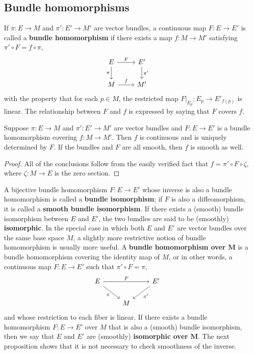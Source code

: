 \subsection{Bundle homomorphisms}
If $\pi:E\to M$ and $\pi':E'\to M'$ are vector bundles, a continuous map $F:E\to E'$ is called a \textbf{bundle homomorphism} if there exists a map $f:M\to M'$ 
satisfying $\pi'\circ F=f\circ\pi$,
\[\begin{tikzcd}
E\ar[r,"F"]\ar[d,swap,"\pi"]&E'\ar[d,"\pi'"]\\
M\ar[r,"f"]&M'
\end{tikzcd}\]
with the property that for each $p\in M$, the restricted map $F|_{E_p}:E_p\to E'_{f(p)}$ is linear. The relationship between $F$ and $f$ is expressed by saying that 
$F$ covers $f$.
\begin{proposition}
Suppose $\pi:E\to M$ and $\pi':E'\to M'$ are vector bundles and $F:E\to E'$ is a bundle homomorphism covering $f:M\to M'$. Then $f$ is continuous and is uniquely determined by $F$. If the bundles and $F$ are all smooth, then $f$ is smooth as well.
\end{proposition}
\begin{proof}
All of the conclusions follow from the easily verified fact that $f=\pi'\circ F\circ\zeta$, where $\zeta:M\to E$ is the zero section.
\end{proof}
A bijective bundle homomorphism $F:E\to E'$ whose inverse is also a bundle homomorphism is called a \textbf{bundle isomorphism}; if $F$ is also a diffeomorphism, it is 
called a \textbf{smooth bundle isomorphism}. If there exists a (smooth) bundle isomorphism between $E$ and $E'$, the two bundles are said to be (smoothly) 
\textbf{isomorphic}. In the special case in which both $E$ and $E'$ are vector bundles over the same base space $M$, a slightly more restrictive notion of bundle 
homomorphism is usually more useful. A \textbf{bundle homomorphism over $\bm{M}$} is a bundle homomorphism covering the identity map of $M$, or in other words, 
a continuous map $F:E\to E'$ such that $\pi'\circ F=\pi$,
\[\begin{tikzcd}
E\ar[rr,"F"]\ar[rd,swap,"\pi"]&&E'\ar[ld,"\pi'"]\\
&M&
\end{tikzcd}\]
and whose restriction to each fiber is linear. If there exists a bundle homomorphism $F:E\to E'$ over $M$ that is also a (smooth) bundle isomorphism, then we say that $E$ and $E'$ are (smoothly) \textbf{isomorphic over $\bm{M}$}. The next proposition shows that it is not necessary to check smoothness of the inverse.
